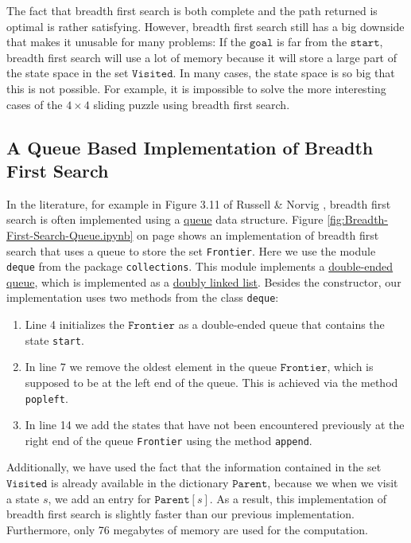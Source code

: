 The fact that breadth first search is both complete and the path returned is optimal is rather
satisfying.  However, breadth first search still has a big downside that makes it unusable for
many problems:  If the $\texttt{goal}$ is far from the $\texttt{start}$, breadth first search will use
a lot of memory because it will store a large part of the state space in the set
$\texttt{Visited}$.  In many cases, the state space is so big that this is not possible.  For example, it is
impossible to solve the more interesting cases of the $4 \times 4$ sliding puzzle using breadth first search.

\subsection{A Queue Based Implementation of Breadth First Search}
In the literature, for example in Figure 3.11 of Russell \& Norvig \cite{russell:2009}, breadth
first search is often implemented using a
\href{https://en.wikipedia.org/wiki/Queue_(abstract_data_type)}{queue} data structure.
Figure \ref{fig:Breadth-First-Search-Queue.ipynb} on page
\pageref{fig:Breadth-First-Search-Queue.ipynb} shows an implementation of breadth first search that
uses a queue to store the set \texttt{Frontier}.   Here we use the module \texttt{deque} from the package
\texttt{collections}. This module implements a
\href{https://en.wikipedia.org/wiki/Double-ended_queue}{double-ended queue}, 
which is implemented as a 
\href{https://en.wikipedia.org/wiki/Doubly_linked_list}{doubly linked list}. 
Besides the constructor, our
implementation uses two methods from the class \texttt{deque}:
\begin{enumerate}
\item Line 4 initializes the $\texttt{Frontier}$ as a double-ended queue that contains the state \texttt{start}.
\item In line 7 we remove the oldest element in the queue $\texttt{Frontier}$, which is supposed to be at the
      left end of the queue.  This is achieved via the method \texttt{popleft}.
\item In line 14 we add the states that have not been encountered previously at the right end of the queue
      \texttt{Frontier} using the method \texttt{append}.
\end{enumerate}
Additionally, we have used the fact that the information contained in the set $\texttt{Visited}$ is already
available in the dictionary $\texttt{Parent}$, because we when we visit a state $s$, we add an entry for
$\mathtt{Parent}[s]$.  As a result, this implementation of breadth first search is slightly faster than our
previous implementation.  Furthermore, only 76 megabytes of memory are used for the computation.

